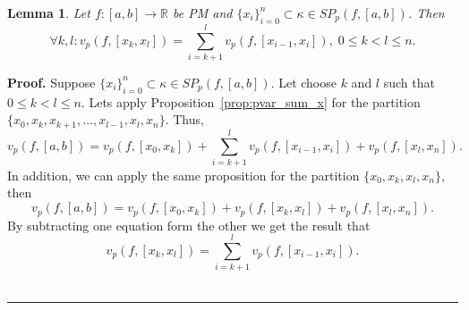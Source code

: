 \documentclass[12pt, a4paper]{article}
\newtheorem{lemma}[theorem]{Lemma}
\newenvironment{proof}[1][Proof]{\noindent \textbf{#1.} }{\  \rule{0.5em}{0.5em}}
\numberwithin{equation}{section}
\begin{document}
\begin{lemma}\label{lm:pvarSubset}
  Let $f:[a,b] \rightarrow \mathbb{R}$ be PM 
  and $\{x_i\}_{i=0}^{n} \subset \kappa \in SP_{p}(f,[a,b])$. Then
  \begin{equation}
    \forall k,l: v_p(f,[x_k,x_l]) = 
      \sum_{i=k+1}^l v_p(f,[x_{i-1},x_i]),\; 0 \leq k<l\leq n. 
  \end{equation}
\end{lemma}
\begin{proof}
  Suppose $\{x_i\}_{i=0}^{n} \subset \kappa \in SP_{p}(f,[a,b])$. 
  Let choose $k$ and $l$ such that $0\leq k<l\leq n$.
  Lets apply Proposition~\ref{prop:pvar_sum_x} for the partition
  $\{x_0,x_k,x_{k+1},\dots,x_{l-1},x_l,x_n\}$. Thus,
  \begin{equation}
    v_p(f,[a,b]) = v_p(f,[x_{0},x_k]) 
      + \sum_{i=k+1}^l v_p(f,[x_{i-1},x_i]) + v_p(f,[x_l,x_n]). 
  \end{equation}
  In addition, we can apply the same proposition for 
  the partition $\{x_0,x_k,x_l,x_n\}$, then
  \begin{equation}
    v_p(f,[a,b]) =  v_p(f,[x_{0},x_k]) + v_p(f,[x_k,x_l]) 
      + v_p(f,[x_l,x_n]). 
  \end{equation}
  By subtracting one equation form the other we get the result that
  \begin{equation}
    v_p(f,[x_k,x_l])= \sum_{i=k+1}^l v_p(f,[x_{i-1},x_i]). 
  \end{equation}
\end{proof}
\end{document}

